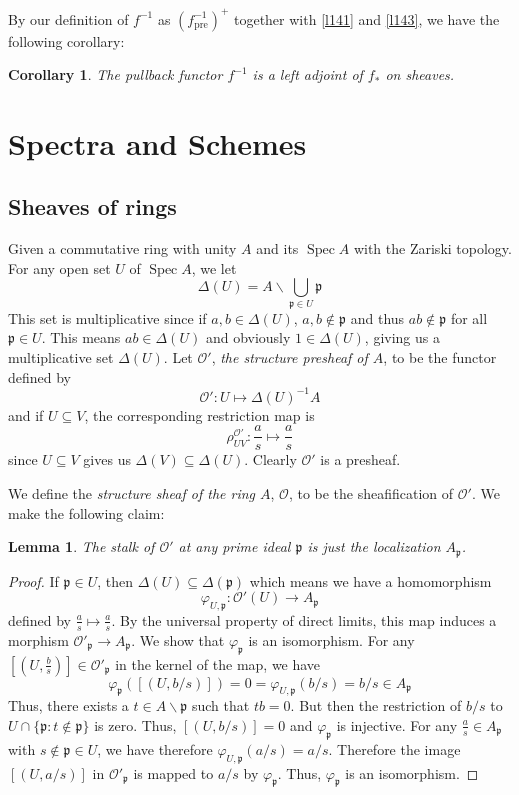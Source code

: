 \documentclass[12pt]{article}
\newtheorem{lemma}{Lemma}[subsection]
\newtheorem{corollary}{Corollary}[subsection]
\theoremstyle{remark}
\newcommand{\D}[0]{\Delta}
\newcommand{\Spec}[0]{\operatorname{Spec}}
\begin{document}
	By our definition of $f^{-1}$ as $(f^{-1}_{\mathrm{pre}})^+$ together with \autoref{l141} and \autoref{l143}, we have the following corollary:
	\begin{corollary}\label{c141}
		The pullback functor $f^{-1}$ is a left adjoint of $f_*$ on sheaves.
	\end{corollary}
	\section{Spectra and Schemes}\label{sec-scheme}
	\subsection{Sheaves of rings}\label{ssec-sheaf-of-ring}
	Given a commutative ring with unity $A$ and its $\Spec A$ with the Zariski topology. For any open set $U$ of $\Spec A$, we let
	\[\D (U)=A\backslash\bigcup_{\mathfrak p\in U}\mathfrak p\]
	This set is multiplicative since if $a, b\in\D(U)$, $a, b\notin \mathfrak p$ and thus $ab\notin \mathfrak p$ for all $\mathfrak p\in U$. This means $ab\in\D (U)$ and obviously $1\in \D(U)$, giving us a multiplicative set $\D(U)$. Let $\mathscr O'$, \textit{the structure presheaf of $A$}, to be the functor defined by
	\[\mathscr O':U\mapsto \D(U)^{-1}A\]
	and if $U\subseteq V$, the corresponding restriction map is
	\[\rho_{UV}^{\mathscr O'}:\frac{a}{s}\mapsto \frac{a}{s}\]
	since $U\subseteq V$ gives us $\D(V)\subseteq \D(U)$. Clearly $\mathscr O'$ is a presheaf.
	
	We define the \textit{structure sheaf of the ring $A$}, $\mathscr O$, to be the sheafification of $\mathscr O'$. We make the following claim:
	\begin{lemma}\label{l211}
	The stalk of $\mathscr O'$ at any prime ideal $\mathfrak p$ is just the localization $A_{\mathfrak p}$.
	\end{lemma}
	\begin{proof}
	If $\mathfrak p\in U$, then $\D(U)\subseteq \D(\mathfrak p)$ which means we have a homomorphism
	\[\varphi_{U,\mathfrak p}:\mathscr O'(U)\to A_{\mathfrak p}\]
	defined by $\frac{a}{s}\mapsto \frac{a}{s}$. By the universal property of direct limits, this map induces a morphism $\mathscr O'_{\mathfrak p}\to A_{\mathfrak p}$. We show that $\varphi_{\mathfrak p}$ is an isomorphism. For any $[(U, \frac{b}{s})]\in \mathscr O'_{\mathfrak p}$ in the kernel of the map, we have
	\[\varphi_{\mathfrak p}([(U, b/s)])=0=\varphi_{U,\mathfrak p}(b/s)=b/s\in A_{\mathfrak p}\]
	Thus, there exists a $t\in A\backslash \mathfrak p$ such that $tb=0$. But then the restriction of $b/s$ to $U\cap \{\mathfrak p:t\notin \mathfrak p\}$ is zero. Thus, $[(U, b/s)]=0$ and $\varphi_{\mathfrak p}$ is injective. For any $\frac{a}{s}\in A_{\mathfrak p}$ with $s\notin \mathfrak p\in U$, we have therefore $\varphi_{U, \mathfrak p}(a/ s)=a/s$. Therefore the image $[(U, a/s)]$ in $\mathscr O'_{\mathfrak p}$ is mapped to $a/s$ by $\varphi_{\mathfrak p}$. Thus, $\varphi_{\mathfrak p}$ is an isomorphism.
	\end{proof}
	
\end{document}
